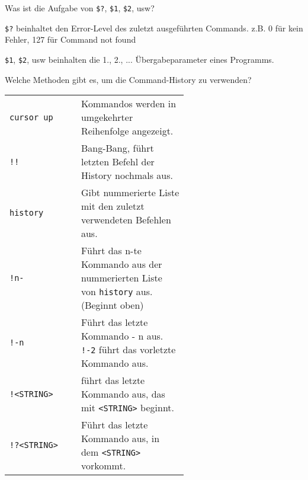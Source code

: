 \begin{flashcard}[Variable]{Was ist die Aufgabe von \texttt{\$?}, \texttt{\$1}, \texttt{\$2}, usw?}
	\begin{description}
		\item \texttt{\$?} beinhaltet den Error-Level des zuletzt ausgeführten Commands. z.B. 0 für kein Fehler, 127 für Command not found
		
		\item \texttt{\$1}, \texttt{\$2}, usw beinhalten die 1., 2., ... Übergabeparameter eines Programms.
	\end{description}
\end{flashcard}

\begin{flashcard}[Command]{Welche Methoden gibt es, um die Command-History zu verwenden?}
	\begin{tabular}{lp{0.6\linewidth}}
		\texttt{cursor up}			& Kommandos werden in umgekehrter Reihenfolge angezeigt.\\
		
		\texttt{!!}					& Bang-Bang, führt letzten Befehl der History nochmals aus.\\
		
		\texttt{history}			& Gibt nummerierte Liste mit den zuletzt verwendeten Befehlen aus.\\
		
		\texttt{!n-}				& Führt das n-te Kommando aus der nummerierten Liste von \texttt{history} aus. (Beginnt oben) \\

		\texttt{!-n}				& Führt das letzte Kommando - n aus. \texttt{!-2} führt das vorletzte Kommando aus.\\
				
		\texttt{!<STRING>}	& führt das letzte Kommando aus, das mit \texttt{<STRING>} beginnt.\\
		
		\texttt{!?<STRING>}	& Führt das letzte Kommando aus, in dem \texttt{<STRING>} vorkommt.
	\end{tabular}
\end{flashcard}

